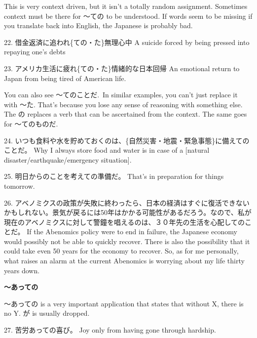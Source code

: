 \par{ This is very context driven, but it isn't a totally random assignment. Sometimes context must be there for ～ての to be understood. If words seem to be missing if you translate back into English, the Japanese is probably bad. }

\par{22. 借金返済に追われ\{ての・た\}無理心中 \hfill\break
A suicide forced by being pressed into repaying one's debts }

\par{23. アメリカ生活に疲れ\{ての・た\}情緒的な日本回帰 \hfill\break
An emotional return to Japan from being tired of American life. }

\par{ You can also see ～てのことだ. In similar examples, you can't just replace it with ～た. That's because you lose any sense of reasoning with something else. The の replaces a verb that can be ascertained from the context. The same goes for ～てのものだ. }

\par{24. いつも食料や水を貯めておくのは、\{自然災害・地震・緊急事態\}に備えてのことだ。 \hfill\break
Why I always store food and water is in case of a [natural disaster\slash earthquake\slash emergency situation]. }

\par{25. 明日からのことを考えての準備だ。 \hfill\break
That's in preparation for things tomorrow. }

\par{26. アベノミクスの政策が失敗に終わったら、日本の経済はすぐに復活できないかもしれない。景気が戻るには50年はかかる可能性があるだろう。なので、私が現在のアベノミクスに対して警鐘を唱えるのは、３０年先の生活を心配してのことだ。 \hfill\break
If the Abenomics policy were to end in failure, the Japanese economy would possibly not be able to quickly recover. There is also the possibility that it could take even 50 years for the economy to recover. So, as for me personally, what raises an alarm at the current Abenomics is worrying about my life thirty years down. }

\begin{center}
\textbf{～あっての }
\end{center}

\par{ ～あっての is a very important application that states that without X, there is no Y. が is usually dropped. }

\par{27. 苦労あっての喜び。 \hfill\break
Joy only from having gone through hardship. }

